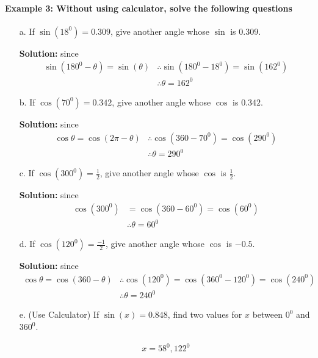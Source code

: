 \documentclass{article}
\begin{document}
\paragraph{Example 3: Without using calculator, solve the following questions}
\begin{enumerate}
  \item[a.] If $\sin(18^{0})= 0.309$, give another angle whose $\sin$ is $0.309$.
        
        {\scriptsize \textbf{Solution:} since}
        \[
        \begin{aligned}
          \sin(180^0-\theta) = \sin(\theta)
          &\therefore \sin(180^{0}-18^{0}) = \sin(162^{0}) \\
          &\therefore \theta = 162^{0}
        \end{aligned}
        \]

  \item[b.] If $\cos(70^{0})= 0.342$, give another angle whose $\cos$ is $0.342$.

        {\scriptsize \textbf{Solution:} since}
        \[
        \begin{aligned}
          \cos\theta = \cos(2\pi - \theta)
          &\therefore \cos(360-70^{0}) = \cos(290^{0}) \\
          &\therefore \theta = 290^{0}
        \end{aligned}
        \]

  \item[c.] If $\cos(300^{0})= \frac{1}{2}$, give another angle whose $\cos$ is $\frac{1}{2}$.

        {\scriptsize \textbf{Solution:} since}
        \[
        \begin{aligned}
          \cos(300^{0}) &= \cos(360-60^{0}) = \cos(60^{0}) \\
                       &\therefore \theta = 60^{0}
        \end{aligned}
        \]

  \item[d.] If $\cos(120^{0})= \frac{-1}{2}$, give another angle whose $\cos$ is $-0.5$.

        {\scriptsize \textbf{Solution:} since}
        \[
        \begin{aligned}
          \cos\theta = \cos(360-\theta)
          &\therefore \cos(120^{0}) = \cos(360^{0} - 120^{0}) = \cos(240^{0}) \\
          &\therefore \theta = 240^{0}
        \end{aligned}
        \]

  \item[e.] (Use Calculator) If $\sin(x)= 0.848$, find two values for $x$ between $0^{0}$ and $360^{0}$.

        \[
        \begin{aligned}
          x = 58^{0}, 122^{0}
        \end{aligned}
        \]
\end{enumerate}
\end{document}
